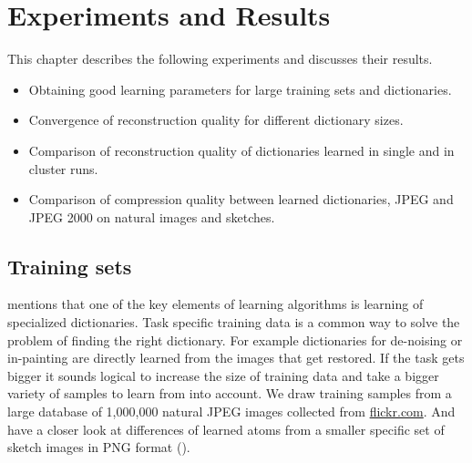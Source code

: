 \chapter{Experiments and Results}

This chapter describes the following experiments and discusses their
results.
\begin{itemize}
 \item Obtaining good learning parameters for large training sets and
dictionaries.
 \item Convergence of reconstruction quality for different dictionary sizes.
 \item Comparison of reconstruction quality of dictionaries
learned in single and in cluster runs. 
 \item Comparison of compression quality between learned dictionaries, JPEG
and JPEG 2000 on natural images and sketches.
\end{itemize}

\section{Training sets}
 mentions that one of the key
elements of learning algorithms is learning of specialized
dictionaries. Task specific training data is a common way to solve the problem
of finding the right dictionary. 
For example dictionaries for de-noising or in-painting are directly learned from
the images that get restored. If the task gets bigger it sounds logical
to increase the size of training data and take a bigger variety of samples to
learn from into account.  We draw training samples from a large database of
1,000,000 natural JPEG images collected from \url{flickr.com}. 
And have a closer look at differences of learned atoms from a smaller specific
set of sketch images in PNG format ().


